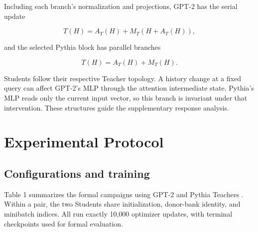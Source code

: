 Including each branch's normalization and projections, GPT-2 has the serial update

\[T(H)=A_T(H)+M_T(H+A_T(H)),\]

and the selected Pythia block has parallel branches

\[T(H)=A_T(H)+M_T(H).\]

Students follow their respective Teacher topology. A history change at a fixed query can affect GPT-2's MLP through the attention intermediate state. Pythia's MLP reads only the current input vector, so this branch is invariant under that intervention. These structures guide the supplementary response analysis.

\section{Experimental Protocol}\label{experimental-protocol}

\subsection{Configurations and training}\label{configurations-and-training}

Table 1 summarizes the formal campaigns using GPT-2 and Pythia Teachers \citep{radford2019gpt2, biderman2023pythia}. Within a pair, the two Students share initialization, donor-bank identity, and minibatch indices. All run exactly 10,000 optimizer updates, with terminal checkpoints used for formal evaluation.

